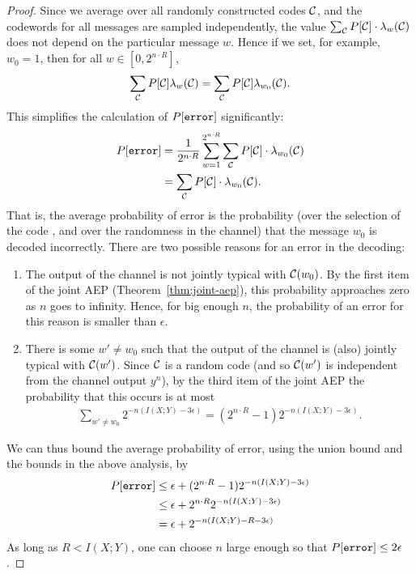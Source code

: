 \begin{proof}
Since we average over all randomly constructed codes $\mathcal{C}$, and the codewords for all messages are sampled independently, the value $\sum_{\mathcal{C}} P[\mathcal{C}] \cdot \lambda_w(\mathcal{C})$ does not depend on the particular message $w$. Hence if we set, for example, $w_0 = 1$, then for all $w \in [0,2^{n \cdot R}]$,
\begin{align}
\sum_{\mathcal{C}} P[\mathcal{C}] \lambda_w(\mathcal{C}) = \sum_{\mathcal{C}} P[\mathcal{C}] \lambda_{w_0}(\mathcal{C}).
\end{align}
This simplifies the calculation of $P[\texttt{error}]$ significantly:
\begin{align}
P[\texttt{error}] &= \frac{1}{2^{n \cdot R}} \sum_{w = 1}^{2^{n \cdot R}} \sum_{\mathcal{C}} P[\mathcal{C}] \cdot \lambda_{w_0}(\mathcal{C})\nonumber\\
&= \sum_{\mathcal{C}} P[\mathcal{C}] \cdot \lambda_{w_0}(\mathcal{C}).
\end{align}
That is, the average probability of error is the probability (over the selection of the code \cran, and over the randomness in the channel) that the message $w_0$ is decoded incorrectly. There are two possible reasons for an error in the decoding:
\begin{enumerate}
\item The output of the channel is not jointly typical with $\mathcal{C}(w_0)$. By the first item of the joint AEP (Theorem~\ref{thm:joint-aep}), this probability approaches zero as $n$ goes to infinity. Hence, for big enough $n$, the probability of an error for this reason is smaller than $\epsilon$.
\item There is some $w' \neq w_0$ such that the output of the channel is (also) jointly typical with $\mathcal{C}(w')$. Since $\mathcal{C}$ is a random code (and so $\mathcal{C}(w')$ is independent from the channel output $y^n$), by the third item of the joint AEP the probability that this occurs is at most
\begin{align}
\sum_{w' \neq w_0} 2^{-n (I(X;Y) - 3 \epsilon)} = (2^{n \cdot R} - 1) 2^{-n (I(X;Y) - 3 \epsilon)}.
\end{align}
\end{enumerate}
We can thus bound the average probability of error, using the union bound and the bounds in the above analysis, by
\begin{align}
P[\texttt{error}] &\leq \epsilon + (2^{n \cdot R} - 1) 2^{-n (I(X;Y) - 3 \epsilon)}\nonumber\\
&\leq \epsilon + 2^{n \cdot R} 2^{-n (I(X;Y) - 3 \epsilon)}\nonumber\\
&= \epsilon + 2^{-n (I(X;Y) - R - 3 \epsilon)}\nonumber\\
\end{align}
As long as $R < I(X;Y)$, one can choose $n$ large enough so that $P[\texttt{error}] \leq 2 \epsilon$.


\end{proof}

